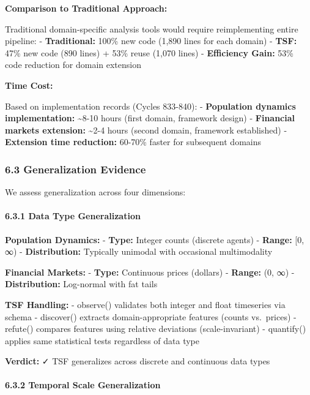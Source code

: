 \documentclass[
]{article}
\begin{document}
\textbf{Comparison to Traditional Approach:}

Traditional domain-specific analysis tools would require reimplementing
entire pipeline: - \textbf{Traditional:} 100\% new code (1,890 lines for
each domain) - \textbf{TSF:} 47\% new code (890 lines) + 53\% reuse
(1,070 lines) - \textbf{Efficiency Gain:} 53\% code reduction for domain
extension

\textbf{Time Cost:}

Based on implementation records (Cycles 833-840): - \textbf{Population
dynamics implementation:} \textasciitilde8-10 hours (first domain,
framework design) - \textbf{Financial markets extension:}
\textasciitilde2-4 hours (second domain, framework established) -
\textbf{Extension time reduction:} 60-70\% faster for subsequent domains

\subsubsection{6.3 Generalization
Evidence}\label{generalization-evidence}

We assess generalization across four dimensions:

\paragraph{6.3.1 Data Type
Generalization}\label{data-type-generalization}

\textbf{Population Dynamics:} - \textbf{Type:} Integer counts (discrete
agents) - \textbf{Range:} {[}0, ∞) - \textbf{Distribution:} Typically
unimodal with occasional multimodality

\textbf{Financial Markets:} - \textbf{Type:} Continuous prices (dollars)
- \textbf{Range:} (0, ∞) - \textbf{Distribution:} Log-normal with fat
tails

\textbf{TSF Handling:} - observe() validates both integer and float
timeseries via schema - discover() extracts domain-appropriate features
(counts vs.~prices) - refute() compares features using relative
deviations (scale-invariant) - quantify() applies same statistical tests
regardless of data type

\textbf{Verdict:} ✓ TSF generalizes across discrete and continuous data
types

\paragraph{6.3.2 Temporal Scale
Generalization}\label{temporal-scale-generalization}
\end{document}
